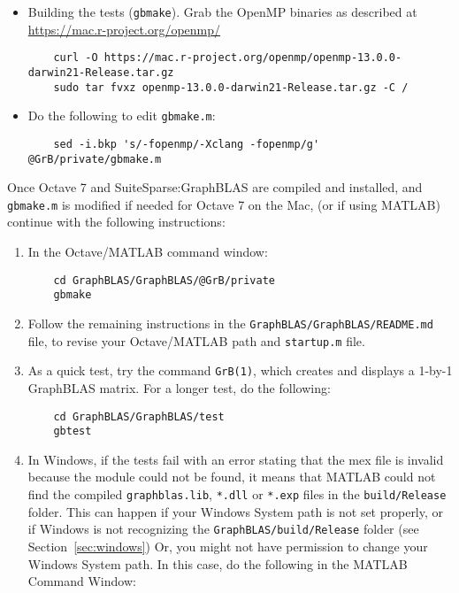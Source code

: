 \documentclass[12pt]{article}
\begin{document}
{\begin{itemize}
\item Building the tests (\verb'gbmake').
    Grab the OpenMP binaries as described at
    \url{https://mac.r-project.org/openmp/}

    {\scriptsize
    \begin{verbatim}
    curl -O https://mac.r-project.org/openmp/openmp-13.0.0-darwin21-Release.tar.gz
    sudo tar fvxz openmp-13.0.0-darwin21-Release.tar.gz -C /
    \end{verbatim} }

\item Do the following to edit \verb'gbmake.m':

    {\scriptsize
    \begin{verbatim}
    sed -i.bkp 's/-fopenmp/-Xclang -fopenmp/g' @GrB/private/gbmake.m
    \end{verbatim} }

\end{itemize}

Once Octave 7 and SuiteSparse:GraphBLAS are compiled and installed,
and \verb'gbmake.m' is modified if needed for Octave 7 on the Mac,
(or if using MATLAB) continue with the following instructions:

\begin{enumerate}
\item In the Octave/MATLAB command window:

    {\small
    \begin{verbatim}
    cd GraphBLAS/GraphBLAS/@GrB/private
    gbmake \end{verbatim} }

\item Follow the remaining instructions in the
    \verb'GraphBLAS/GraphBLAS/README.md' file, to revise your
    Octave/MATLAB path and \verb'startup.m' file.

\item As a quick test, try the command \verb'GrB(1)', which
    creates and displays a 1-by-1 GraphBLAS matrix.  For a longer test, do the
    following:

    {\small
    \begin{verbatim}
    cd GraphBLAS/GraphBLAS/test
    gbtest \end{verbatim} }

\item In Windows, if the tests fail with an error stating that the
    mex file is invalid because the module could not be found, it means
    that MATLAB could not find the compiled \verb'graphblas.lib', \verb'*.dll'
    or \verb'*.exp' files in the \verb'build/Release' folder.  This can happen
    if your Windows System path is not set properly, or if Windows is not
    recognizing the \verb'GraphBLAS/build/Release' folder (see
    Section~\ref{sec:windows})  Or, you might not have permission to change your
    Windows System path.  In this case, do the following in the MATLAB Command
    \vspace{-0.1in}
    Window:


\end{enumerate}}
\end{document}
